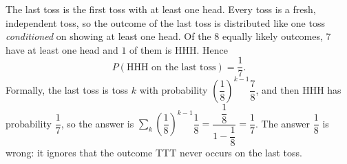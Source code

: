 The last toss is the first toss with at least one head. Every toss is a fresh, independent toss, so the outcome of the last toss is distributed like one toss \emph{conditioned} on showing at least one head. Of the $8$ equally likely outcomes, $7$ have at least one head and $1$ of them is HHH. Hence
\[
P(\text{HHH on the last toss})=\dfrac{1}{7}.
\]
Formally, the last toss is toss $k$ with probability $\left(\dfrac{1}{8}\right)^{k-1}\dfrac{7}{8}$, and then HHH has probability $\dfrac{1}{7}$, so the answer is $\sum_k\left(\dfrac{1}{8}\right)^{k-1}\dfrac{1}{8}=\dfrac{\dfrac{1}{8}}{1-\dfrac{1}{8}}=\boxed{\dfrac{1}{7}}$. The answer $\dfrac{1}{8}$ is wrong: it ignores that the outcome TTT never occurs on the last toss.
